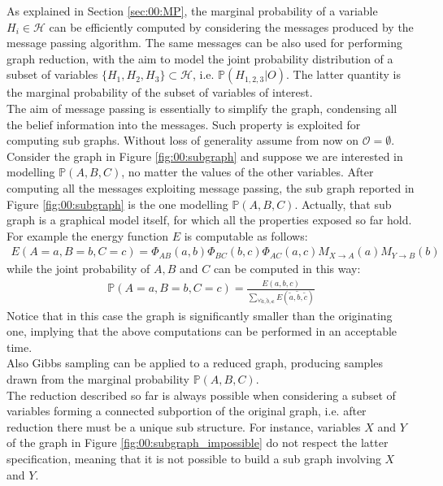 As explained in Section \ref{sec:00:MP}, the marginal probability of a variable $H_i \in \mathcal{H}$ can be efficiently computed by considering the messages produced by the message passing algorithm. The same messages can be also used for performing graph reduction, with the aim to model the joint probability distribution of a subset of variables $\lbrace H_1, H_2, H_3 \rbrace \subset \mathcal{H}$, i.e. $\mathbb{P}( H_{1,2,3} | O)$. The latter quantity is the marginal probability of the subset of variables of interest.
\\
The aim of message passing is essentially to simplify the graph, condensing all the belief information into the messages. Such property is exploited for computing sub graphs. Without loss of generality assume from now on $\mathcal{O} = \emptyset$.
Consider the graph in Figure \ref{fig:00:subgraph} and suppose we are interested in modelling $\mathbb{P}( A,B,C)$, no matter the values of the other variables. After computing all the messages exploiting message passing, the sub graph reported in Figure \ref{fig:00:subgraph} is the one modelling $\mathbb{P}( A,B,C)$. Actually, that sub graph is a graphical model itself, for which all the properties exposed so far hold.
For example the energy function $E$ is computable as follows:
\begin{eqnarray}
E(A = a,B = b,C= c) = 
\Phi _{AB}(a,b)
\Phi _{BC}(b,c)
\Phi _{AC}(a,c)
M _{X \rightarrow A}(a)
M _{Y \rightarrow B}(b)
\end{eqnarray}
while the joint probability of $A,B$ and $C$ can be computed in this way:
\begin{eqnarray}
\mathbb{P}(A = a,B = b,C= c) = \frac{E(a,b,c)}{ 
\sum _{ \forall \tilde{a},\tilde{b}, \textbf{c}  } E(\tilde{a},\tilde{b},\tilde{c}) }
\end{eqnarray}
Notice that in this case the graph is significantly smaller than the originating one, implying that the above computations can be performed in an acceptable time.
\\
Also Gibbs sampling can be applied to a reduced graph, producing samples drawn from the marginal probability $\mathbb{P}( A,B,C)$.
\\
The reduction described so far is always possible when considering a subset of variables forming a connected subportion of the original graph, i.e. after reduction there must be a unique sub structure. For instance, variables $X$ and $Y$ of the graph in Figure \ref{fig:00:subgraph_impossible} do not respect the latter specification, meaning that it is not possible to build a sub graph involving $X$ and $Y$.


